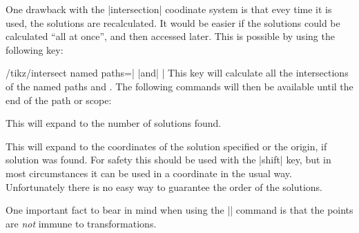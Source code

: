   One drawback with the |intersection| coodinate system is that
  evey time it is used, the solutions are recalculated. It would be
  easier if the solutions could be calculated ``all at once'', and
  then accessed later. This is possible by using the following key:
  
\begin{key}{/tikz/intersect named paths=| |and| |}
  This key will calculate all the intersections of the named paths
   and . The following commands will then
  be available until the end of the path or scope:

\begin{command}{\solutions}
  This will expand to the number of solutions found.
\end{command}

\begin{command}{\solution{}}
  This will expand to the coordinates of the solution specified or the 
  origin, if solution  was found. For safety this should
  be used with the |shift| key, but in most circumstances it can be
  used in a coordinate in the usual way.
  Unfortunately there is no easy way to guarantee the order of the
  solutions.
\end{command}

  

\begin{codeexample}[]
\end{codeexample}

   One important fact to bear in mind when using the |\solution|
   command is that the points are \emph{not} immune to transformations.

\begin{codeexample}[]
%
\end{codeexample}
   
\end{key}


